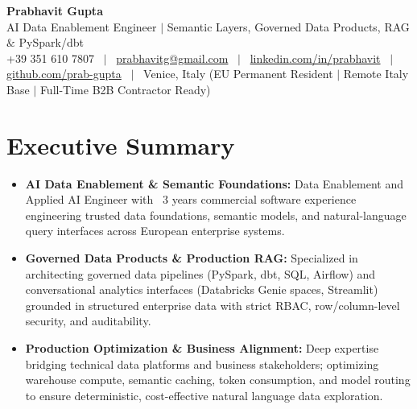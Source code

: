 \documentclass[a4paper,10pt]{article}
\begin{document}
\begin{minipage}[c]{0.80\textwidth}
  {\Huge\bfseries Prabhavit Gupta}\\[3pt]
  {\color{accent}\large AI Data Enablement Engineer $\vert$ Semantic Layers, Governed Data Products, RAG $\&$ PySpark/dbt}\\[6pt]
  {\footnotesize +39 351 610 7807 ~$\vert$~
  \href{mailto:prabhavitg@gmail.com}{prabhavitg@gmail.com} ~$\vert$~
  \href{https://www.linkedin.com/in/prabhavit/}{linkedin.com/in/prabhavit} ~$\vert$~
  \href{https://github.com/prab-gupta}{github.com/prab-gupta} ~$\vert$~
  Venice, Italy (EU Permanent Resident $\vert$ Remote Italy Base $\vert$ Full-Time B2B Contractor Ready)}
\end{minipage}\hfill

\vspace{6pt}

\section{Executive Summary}
\begin{itemize}
  \item \textbf{AI Data Enablement \& Semantic Foundations:} Data Enablement and Applied AI Engineer with ~3 years commercial software experience engineering trusted data foundations, semantic models, and natural-language query interfaces across European enterprise systems.
  \item \textbf{Governed Data Products \& Production RAG:} Specialized in architecting governed data pipelines (PySpark, dbt, SQL, Airflow) and conversational analytics interfaces (Databricks Genie spaces, Streamlit) grounded in structured enterprise data with strict RBAC, row/column-level security, and auditability.
  \item \textbf{Production Optimization \& Business Alignment:} Deep expertise bridging technical data platforms and business stakeholders; optimizing warehouse compute, semantic caching, token consumption, and model routing to ensure deterministic, cost-effective natural language data exploration.
\end{itemize}

\end{document}
